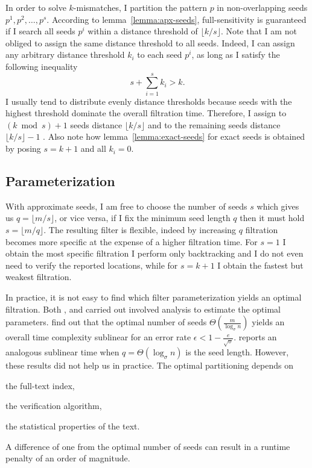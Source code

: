 In order to solve $k$-mismatches, I partition the pattern $p$ in non-overlapping seeds $p^1, p^2, \dots, p^s$. According to lemma~\ref{lemma:apx-seeds}, full-sensitivity is guaranteed if I search all seeds $p^i$ within a distance threshold of $\lfloor k/s \rfloor$.
Note that I am not obliged to assign the same distance threshold to all seeds.
Indeed, I can assign any arbitrary distance threshold $k_i$ to each seed $p^i$, as long as I satisfy the following inequality
\begin{equation}
s + \sum_{i=1}^{s}{k_i} > k.
\end{equation}
I usually tend to distribute evenly distance thresholds because seeds with the highest threshold dominate the overall filtration time.
Therefore, I assign to $(k \bmod{s}) + 1$ seeds distance $\lfloor k/s \rfloor$ and to the remaining seeds distance $\lfloor k/s \rfloor - 1$ \citep{Siragusa2013}.
Also note how lemma~\ref{lemma:exact-seeds} for exact seeds is obtained by posing $s=k+1$ and all $k_i = 0$.

\subsection{Parameterization}

With approximate seeds, I am free to choose the number of seeds $s$ which gives us $q =\lfloor m/s \rfloor$, or vice versa, if I fix the minimum seed length $q$ then it must hold $s = \lfloor m/q \rfloor$.
The resulting filter is flexible, indeed by increasing $q$ filtration becomes more specific at the expense of a higher filtration time.
For $s=1$ I obtain the most specific filtration \ie I perform only backtracking and I do not even need to verify the reported locations, while for $s=k+1$ I obtain the fastest but weakest filtration.

In practice, it is not easy to find which filter parameterization yields an optimal filtration.
Both \citeauthor{Myers1994}, and \citeauthor{Navarro2000} carried out involved analysis to estimate the optimal parameters. \citeauthor{Navarro2000} find out that the optimal number of seeds $\Theta(\frac{m}{\log_{\sigma}{n}})$ yields an overall time complexity sublinear for an error rate $\epsilon < 1 - \frac{e}{\sqrt{\sigma}}$.
\citeauthor{Myers1994} reports an analogous sublinear time when $q=\Theta(\log_{\sigma}{n})$ is the seed length.
However, these results did not help us in practice.
The optimal partitioning depends on
\begin{inparaenum}[(i)]
\item the full-text index,
\item the verification algorithm,
\item the statistical properties of the text.
\end{inparaenum}
A difference of one from the optimal number of seeds can result in a runtime penalty of an order of magnitude.


